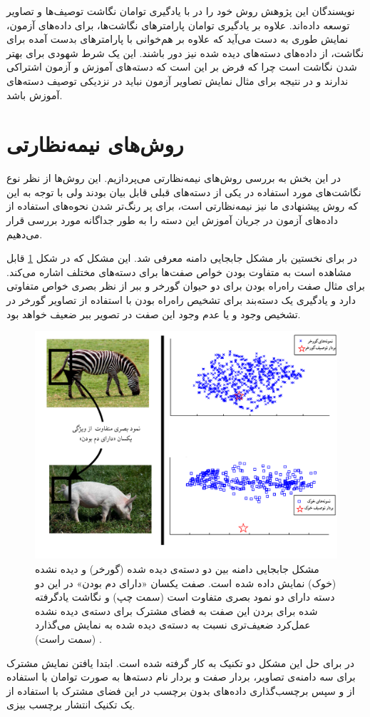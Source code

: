 نویسندگان این پژوهش روش خود را در \cite{agnostic} با یادگیری توامان نگاشت توصیف‌ها و تصاویر توسعه داده‌اند. علاوه بر یادگیری توامان پارامترهای نگاشت‌ها، برای داده‌های آزمون، نمایش طوری به دست می‌آید که علاوه بر هم‌خوانی با پارامترهای بدست آمده برای نگاشت، از داده‌های دسته‌های دیده شده نیز دور باشند. این یک شرط شهودی برای بهتر شدن نگاشت است چرا که فرض بر این است که دسته‌های آموزش و آزمون اشتراکی ندارند و در نتیجه برای مثال نمایش تصاویر آزمون نباید در نزدیکی توصیف دسته‌های آموزش باشد.

\section{روش‌های نیمه‌نظارتی}\label{lr:semi}
در این بخش به بررسی روش‌های نیمه‌نظارتی می‌پردازیم. این روش‌ها از نظر نوع نگاشت‌های مورد استفاده در یکی از دسته‌های قبلی قابل بیان بودند ولی با توجه به این که روش پیشنهادی ما نیز نیمه‌نظارتی است، برای پر رنگ‌تر شدن نحوه‌های استفاده از داده‌های آزمون در جریان آموزش این دسته را به طور جداگانه مورد بررسی قرار می‌دهیم.

در \cite{Fu2014} برای نخستین بار مشکل جابجایی دامنه معرفی شد. این مشکل که در شکل 
\ref{fig:domain_shift}
قابل مشاهده است به متفاوت بودن خواص صفت‌ها برای دسته‌های مختلف اشاره می‌کند. برای مثال صفت راه‌راه بودن برای دو حیوان گورخر و ببر از نظر بصری خواص متفاوتی دارد و یادگیری یک دسته‌بند برای تشخیص راه‌راه بودن با استفاده از تصاویر گورخر در تشخیص وجود و یا عدم وجود این صفت در تصویر ببر ضعیف خواهد بود.

\begin{figure}[h]
\centering
\includegraphics[width=0.7\linewidth]{images/domain_shift}
\caption[مشکل جابجایی دامنه]{
مشکل جابجایی دامنه بین دو دسته‌ی دیده شده (گورخر) و دیده نشده (خوک) نمایش داده شده است. صفت یکسان «دارای دم بودن» در این دو دسته دارای دو نمود بصری متفاوت است (سمت چپ) و نگاشت یادگرفته شده برای بردن این صفت به فضای مشترک برای دسته‌ی دیده نشده عمل‌کرد ضعیف‌تری نسبت به دسته‌ی دیده شده به نمایش می‌گذارد (سمت راست) 
\cite{Fu2014}.}
\label{fig:domain_shift}
\end{figure}
 در \cite{Fu2014} 
برای حل این مشکل دو تکنیک به کار گرفته شده است. ابتدا یافتن نمایش مشترک برای سه دامنه‌ی تصاویر، بردار صفت و بردار نام دسته‌ها به صورت توامان با استفاده از 
\cite{cca}
 و سپس برچسب‌گذاری داده‌های بدون برچسب در این فضای مشترک با استفاده از یک تکنیک انتشار برچسب بیزی. 

